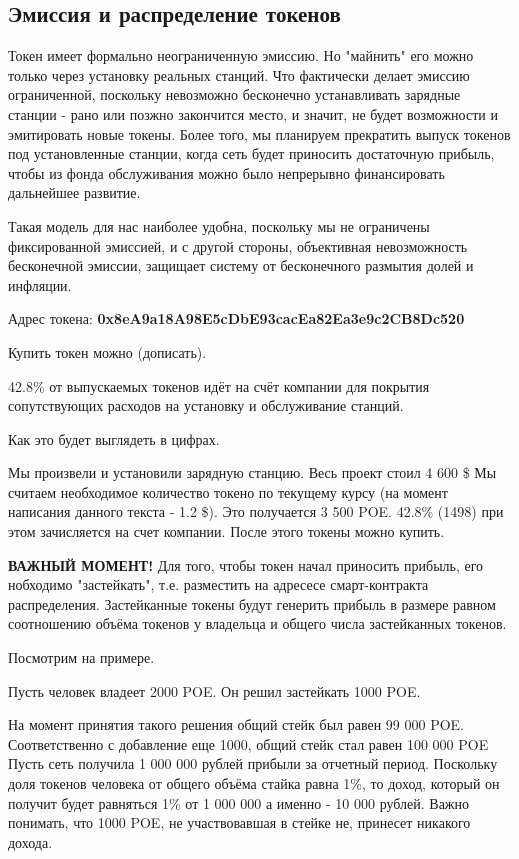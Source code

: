 \documentclass[a4paper,12pt]{report}
\begin{document}
\subsection{Эмиссия и распределение токенов}

Токен имеет формально неограниченную эмиссию. Но "майнить" его можно только через установку реальных станций. Что фактически делает эмиссию ограниченной, поскольку невозможно бесконечно устанавливать зарядные станции - рано или позжно закончится место, и значит, не будет возможности и эмитировать новые токены. Более того, мы планируем прекратить выпуск токенов под установленные станции, когда сеть будет приносить достаточную прибыль, чтобы из фонда обслуживания можно было непрерывно финансировать дальнейшее развитие. 

Такая модель для нас наиболее удобна, поскольку мы не ограничены фиксированной эмиссией, и с другой стороны, объективная невозможность бесконечной эмиссии, защищает систему от бесконечного размытия долей и инфляции. 

 
Адрес токена:
\textbf{0x8eA9a18A98E5cDbE93cacEa82Ea3e9c2CB8Dc520}

Купить токен можно (дописать).  

42.8\% от выпускаемых токенов идёт на счёт компании для покрытия сопутствующих расходов на установку и обслуживание станций.

Как это будет выглядеть в цифрах.

Мы произвели и установили зарядную станцию. Весь проект стоил 4 600 \$ Мы считаем необходимое количество токено по текущему курсу (на момент написания данного текста - 1.2 \$). Это получается 3 500 POE. 42.8\% (1498) при этом зачисляется на счет компании. После этого токены можно купить.

\textbf{ВАЖНЫЙ МОМЕНТ!} Для того, чтобы токен начал приносить прибыль, его нобходимо "застейкать", т.е. разместить на адресесе смарт-контракта распределения. Застейканные токены будут генерить прибыль в размере равном соотношению объёма токенов у владельца и общего числа застейканных токенов. 

Посмотрим на примере.

Пусть человек владеет 2000 POE. Он решил застейкать 1000 POE.

На момент принятия такого решения общий стейк был равен 99 000 POE. Соответственно с добавление еще 1000, общий стейк стал равен 100 000 POE
Пусть сеть получила 1 000 000 рублей прибыли за отчетный период. Поскольку доля токенов человека от общего объёма стайка равна 1\%, то доход, который он получит будет равняться 1\% от 1 000 000 а именно - 10 000 рублей. Важно понимать, что 1000 POE, не участвовавшая в стейке не, принесет никакого дохода. 
\end{document}
